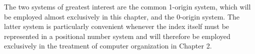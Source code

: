 \par The two systems of greatest interest are the common 1-origin system, which will be employed almost exclusively in this chapter, and the 0-origin system. The latter system is particularly convenient whenever the index itself must be represented in a positional number system and will therefore be employed exclusively in the treatment of computer organization in Chapter 2.
